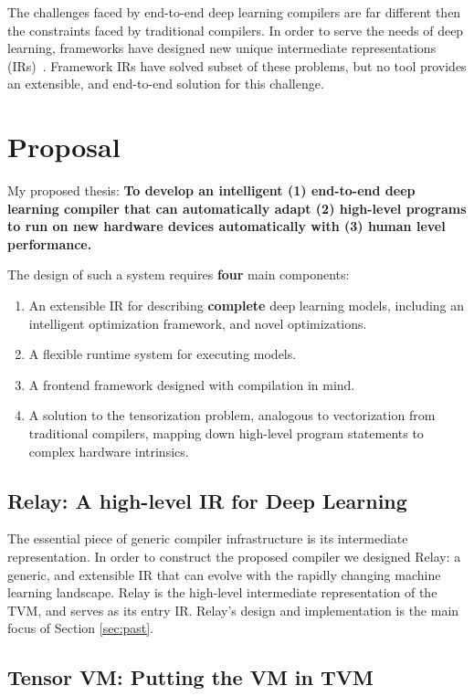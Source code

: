 The challenges faced by end-to-end deep learning compilers are far
  different then the constraints faced by traditional compilers.
In order to serve the needs of deep learning, frameworks have designed new
  unique intermediate representations (IRs)~\cite{tensorflow, pytorch_ad, chainer_learningsys2015, tangent, theano, glow}.
Framework IRs have solved subset of these problems,
  but no tool provides an extensible,
  and end-to-end solution for this challenge.

\section{Proposal}

My proposed thesis: \textbf{To develop an intelligent (1) end-to-end deep learning compiler that can
automatically adapt (2) high-level programs to run on new hardware devices automatically
with (3) human level performance.}

The design of such a system requires \textbf{four} main components:
\begin{enumerate}
  \item An extensible IR for describing \textbf{complete} deep learning models,
        including an intelligent optimization framework, and novel optimizations.
  \item A flexible runtime system for executing models.
  \item A frontend framework designed with compilation in mind.
  \item A solution to the tensorization problem, analogous to vectorization from traditional
        compilers, mapping down high-level program statements to complex hardware intrinsics.
\end{enumerate}

\subsection{Relay: A high-level IR for Deep Learning}

The essential piece of generic compiler infrastructure is
  its intermediate representation.
In order to construct the proposed compiler we designed Relay: a generic, and
  extensible IR that can evolve with the rapidly changing
  machine learning landscape.
Relay is the high-level intermediate representation of the TVM,
  and serves as its entry IR.
Relay's design and implementation is the main focus of Section \ref{sec:past}.

\subsection{Tensor VM: Putting the VM in TVM}

